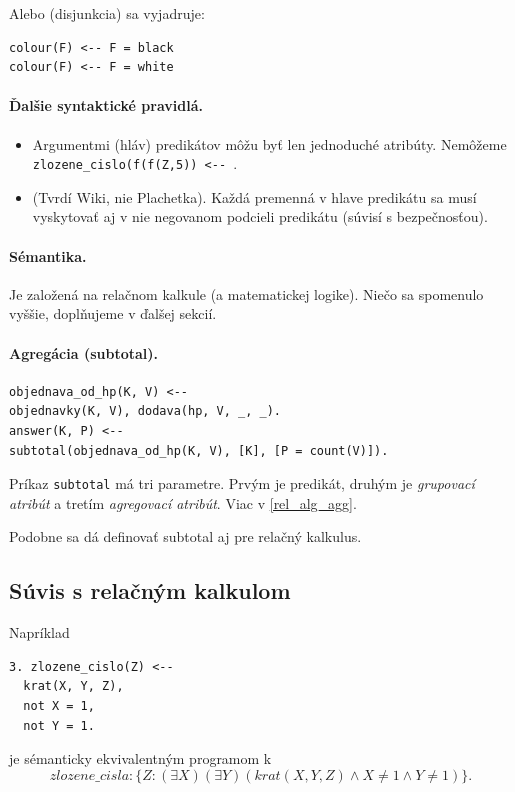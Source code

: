 \documentclass[10pt,a4paper]{article}
\begin{document}
Alebo (disjunkcia) sa vyjadruje:
\begin{verbatim}
colour(F) <-- F = black
colour(F) <-- F = white
\end{verbatim} 
  
\paragraph{Ďalšie syntaktické pravidlá.}

\begin{itemize}
\item Argumentmi (hláv) predikátov môžu byť len jednoduché atribúty. Nemôžeme \verb|zlozene_cislo(f(f(Z,5)) <-- |. 
\item (Tvrdí Wiki, nie Plachetka). Každá premenná v hlave predikátu sa musí vyskytovať aj v nie negovanom podcieli predikátu (súvisí s bezpečnosťou). 
\end{itemize}

\paragraph{Sémantika.}
Je založená na relačnom kalkule (a matematickej logike). 
Niečo sa spomenulo vyššie, doplňujeme v ďalšej sekcií. 

\paragraph{Agregácia (subtotal).}
\begin{verbatim}
objednava_od_hp(K, V) <--
objednavky(K, V), dodava(hp, V, _, _).
answer(K, P) <--
subtotal(objednava_od_hp(K, V), [K], [P = count(V)]).
\end{verbatim} 

Príkaz \verb|subtotal| má tri parametre. Prvým je predikát, druhým je \emph{grupovací atribút} a tretím \emph{agregovací atribút}. Viac v \ref{rel_alg_agg}. 

Podobne sa dá definovať subtotal aj pre relačný kalkulus. 

\subsection{Súvis s relačným kalkulom}

Napríklad 
\begin{verbatim}
3. zlozene_cislo(Z) <--
  krat(X, Y, Z),
  not X = 1,
  not Y = 1.
\end{verbatim} 
je sémanticky ekvivalentným programom k $$
zlozene\_cisla: \{Z : (\exists X) (\exists Y) (krat(X,Y,Z) \wedge X \neq 1 \wedge Y \neq 1)\}.
$$
\end{document}
